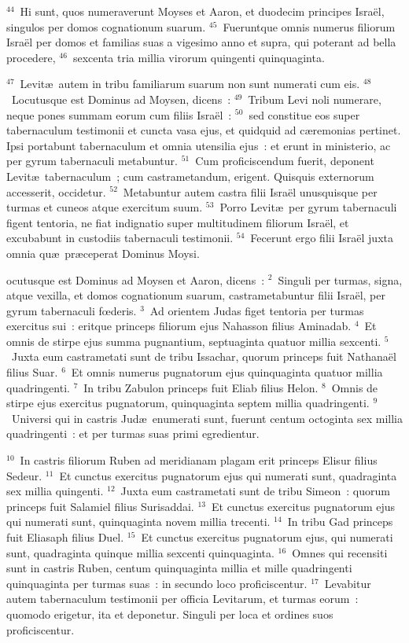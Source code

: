 ${}^{44}$~Hi sunt, quos numeraverunt Moyses et Aaron, et duodecim principes Isra\"el, singulos per domos cognationum suarum.
${}^{45}$~Fueruntque omnis numerus filiorum Isra\"el per domos et familias suas a vigesimo anno et supra, qui poterant ad bella procedere,
${}^{46}$~sexcenta tria millia virorum quingenti quinquaginta.


${}^{47}$~Levit\ae\ autem in tribu familiarum suarum non sunt numerati cum eis.
${}^{48}$~Locutusque est Dominus ad Moysen, dicens~:
${}^{49}$~Tribum Levi noli numerare, neque pones summam eorum cum filiis Isra\"el~:
${}^{50}$~sed constitue eos super tabernaculum testimonii et cuncta vasa ejus, et quidquid ad c\ae remonias pertinet. Ipsi portabunt tabernaculum et omnia utensilia ejus~: et erunt in ministerio, ac per gyrum tabernaculi metabuntur.
${}^{51}$~Cum proficiscendum fuerit, deponent Levit\ae\ tabernaculum~; cum castrametandum, erigent. Quisquis externorum accesserit, occidetur.
${}^{52}$~Metabuntur autem castra filii Isra\"el unusquisque per turmas et cuneos atque exercitum suum.
${}^{53}$~Porro Levit\ae\ per gyrum tabernaculi figent tentoria, ne fiat indignatio super multitudinem filiorum Isra\"el, et excubabunt in custodiis tabernaculi testimonii.
${}^{54}$~Fecerunt ergo filii Isra\"el juxta omnia qu\ae\ pr\ae ceperat Dominus Moysi.

\bchapter
{}ocutusque est Dominus ad Moysen et Aaron, dicens~:
${}^{2}$~Singuli per turmas, signa, atque vexilla, et domos cognationum suarum, castrametabuntur filii Isra\"el, per gyrum tabernaculi fœderis.
${}^{3}$~Ad orientem Judas figet tentoria per turmas exercitus sui~: eritque princeps filiorum ejus Nahasson filius Aminadab.
${}^{4}$~Et omnis de stirpe ejus summa pugnantium, septuaginta quatuor millia sexcenti.
${}^{5}$~Juxta eum castrametati sunt de tribu Issachar, quorum princeps fuit Nathana\"el filius Suar.
${}^{6}$~Et omnis numerus pugnatorum ejus quinquaginta quatuor millia quadringenti.
${}^{7}$~In tribu Zabulon princeps fuit Eliab filius Helon.
${}^{8}$~Omnis de stirpe ejus exercitus pugnatorum, quinquaginta septem millia quadringenti.
${}^{9}$~Universi qui in castris Jud\ae\ enumerati sunt, fuerunt centum octoginta sex millia quadringenti~: et per turmas suas primi egredientur.


${}^{10}$~In castris filiorum Ruben ad meridianam plagam erit princeps Elisur filius Sedeur.
${}^{11}$~Et cunctus exercitus pugnatorum ejus qui numerati sunt, quadraginta sex millia quingenti.
${}^{12}$~Juxta eum castrametati sunt de tribu Simeon~: quorum princeps fuit Salamiel filius Surisaddai.
${}^{13}$~Et cunctus exercitus pugnatorum ejus qui numerati sunt, quinquaginta novem millia trecenti.
${}^{14}$~In tribu Gad princeps fuit Eliasaph filius Duel.
${}^{15}$~Et cunctus exercitus pugnatorum ejus, qui numerati sunt, quadraginta quinque millia sexcenti quinquaginta.
${}^{16}$~Omnes qui recensiti sunt in castris Ruben, centum quinquaginta millia et mille quadringenti quinquaginta per turmas suas~: in secundo loco proficiscentur.
${}^{17}$~Levabitur autem tabernaculum testimonii per officia Levitarum, et turmas eorum~: quomodo erigetur, ita et deponetur. Singuli per loca et ordines suos proficiscentur.


